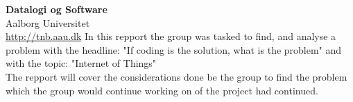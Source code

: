 {%
  \textbf{Datalogi og Software}\\
  Aalborg Universitet\\
  \href{http://tnb.aau.dk}{http://tnb.aau.dk}
}{%
  In this repport the group was tasked to find, and analyse a problem with the headline: "If coding is the solution, what is the problem" and with the topic: "Internet of Things"\\
  The repport will cover the considerations done be the group to find the problem which the group would continue working on of the project had continued.
}